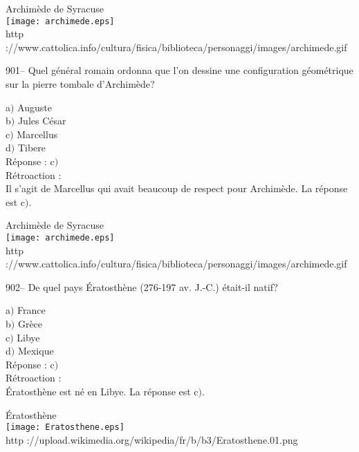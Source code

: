 ﻿\documentclass[letterpaper, 12pt]{article}
\begin{document}
        \begin{center}
        Archim\`ede de Syracuse\\
    \texttt{[image: archimede.eps]}\\
        {\footnotesize http
://www.cattolica.info/cultura/fisica/biblioteca/personaggi/images/archimede.gif}
    \end{center}

901-- Quel g\'en\'eral romain ordonna que l'on dessine une
configuration g\'eom\'etrique sur la pierre tombale d'Archim\`ede?

a$)$ Auguste \\
b$)$ Jules C\'esar \\
c$)$ Marcellus \\
d$)$ Tibere \\

R\'eponse : c$)$\\

R\'etroaction : \\
Il s'agit de Marcellus qui avait beaucoup de respect pour Archim\`ede. La
r\'eponse est c$)$.\\

        \begin{center}
        Archim\`ede de Syracuse\\
    \texttt{[image: archimede.eps]}\\
        {\footnotesize http
://www.cattolica.info/cultura/fisica/biblioteca/personaggi/images/archimede.gif}
    \end{center}

902-- De quel pays \'Eratosth\`ene (276-197 av. J.-C.) \'etait-il
natif?

a$)$ France  \\
b$)$ Gr\`ece  \\
c$)$ Libye \\
d$)$ Mexique \\

R\'eponse : c$)$\\

R\'etroaction : \\
\'Eratosth\`ene est n\'e en Libye. La r\'eponse est c$)$.\\

        \begin{center}
        \'Eratosth\`ene\\
    \texttt{[image: Eratosthene.eps]}\\
        {\footnotesize http
://upload.wikimedia.org/wikipedia/fr/b/b3/Eratosthene.01.png}
    \end{center}
\end{document}
